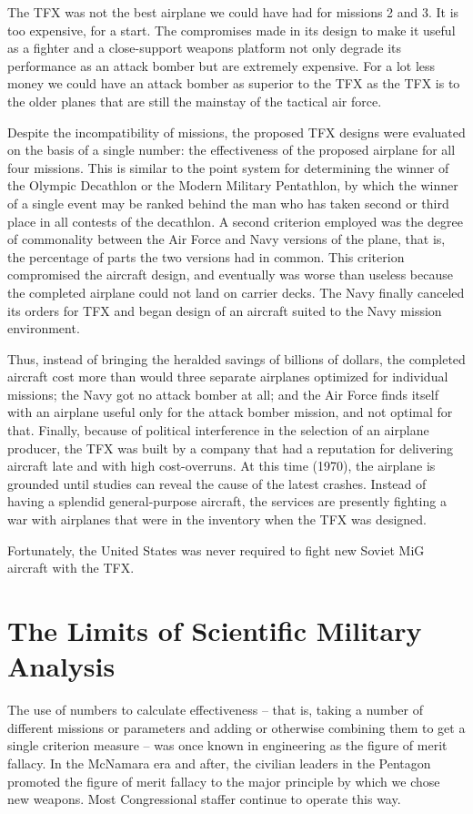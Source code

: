The TFX was not the best airplane we could have had for missions 2 and 3. It is too expensive, for a start. The compromises made in its design to make it useful as a fighter and a close-support weapons platform not only degrade its performance as an attack bomber but are extremely expensive. For a lot less money we could have an attack bomber as superior to the TFX as the TFX is to the older planes that are still the mainstay of the tactical air force.

Despite the incompatibility of missions, the proposed TFX designs were evaluated on the basis of a single number: the effectiveness of the proposed airplane for all four missions. This is similar to the point system for determining the winner of the Olympic Decathlon or the Modern Military Pentathlon, by which the winner of a single event may be ranked behind the man who has taken second or third place in all contests of the decathlon. A second criterion employed was the degree of commonality between the Air Force and Navy versions of the plane, that is, the percentage of parts the two versions had in common. This criterion compromised the aircraft design, and eventually was worse than useless because the completed airplane could not land on carrier decks. The Navy finally canceled its orders for TFX and began design of an aircraft suited to the Navy mission environment.

Thus, instead of bringing the heralded savings of billions of dollars, the completed aircraft cost more than would three separate airplanes optimized for individual missions; the Navy got no attack bomber at all; and the Air Force finds itself with an airplane useful only for the attack bomber mission, and not optimal for that. Finally, because of political interference in the selection of an airplane producer, the TFX was built by a company that had a reputation for delivering aircraft late and with high cost-overruns. At this time (1970), the airplane is grounded until studies can reveal the cause of the latest crashes. Instead of having a splendid general-purpose aircraft, the services are presently fighting a war with airplanes that were in the inventory when the TFX was designed.

Fortunately, the United States was never required to fight new Soviet MiG aircraft with the TFX.

\section{The Limits of Scientific Military Analysis}
The use of numbers to calculate effectiveness -- that is, taking a number of different missions or parameters and adding or otherwise combining them to get a single criterion measure -- was once known in engineering as the figure of merit fallacy. In the McNamara era and after, the civilian leaders in the Pentagon promoted the figure of merit fallacy to the major principle by which we chose new weapons. Most Congressional staffer continue to operate this way.


